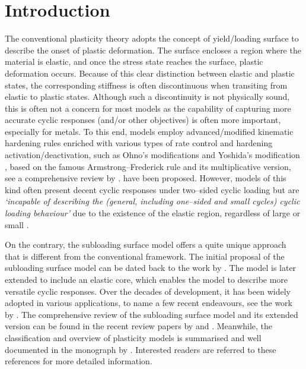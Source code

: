 \section{Introduction}
The conventional plasticity theory adopts the concept of yield/loading surface \citep[see, e.g.,][]{Lemaitre1990,Simo1998} to describe the onset of plastic deformation.
The surface encloses a region where the material is elastic, and once the stress state reaches the surface, plastic deformation occurs.
Because of this clear distinction between elastic and plastic states, the corresponding stiffness is often discontinuous when transiting from elastic to plastic states.
Although such a discontinuity is not physically sound, this is often not a concern for most models as the capability of capturing more accurate cyclic responses (and/or other objectives) is often more important, especially for metals.
To this end, models employ advanced/modified kinematic hardening rules enriched with various types of rate control and hardening activation/deactivation, such as Ohno's modifications \citep[see, e.g.,][]{Ohno1982,Ohno1993,Ohno2021} and Yoshida's modification \citep{Yoshida2002}, based on the famous Armstrong--Frederick rule \citep{Frederick2007} and its multiplicative version, see a comprehensive review by \citet{Chaboche2008}. have been proposed.
However, models of this kind often present decent cyclic responses under two--sided cyclic loading but are \emph{`incapable of describing the \textnormal{(general, including one--sided and small cycles)} cyclic loading behaviour'} \citep[][pg. 282]{Hashiguchi2023} due to the existence of the elastic region, regardless of large or small \citep{Dafalias1977}.

On the contrary, the subloading surface model offers a quite unique approach that is different from the conventional framework.
The initial proposal of the subloading surface model can be dated back to the work by \citet{Hashiguchi1980}.
The model is later extended \citep{Hashiguchi1989} to include an elastic core, which enables the model to describe more versatile cyclic responses.
Over the decades of development, it has been widely adopted in various applications, to name a few recent endeavours, see the work by \citet{Maranha2016,Xiong2018,Anjiki2021,Yamakawa2021,Yamakawa2022,Lu2023}.
The comprehensive review of the subloading surface model and its extended version can be found in the recent review papers by \citet{Hashiguchi2023a} and \citet{Hashiguchi2024}.
Meanwhile, the classification and overview of plasticity models is summarised and well documented in the monograph by \citet[see][\S~10.2]{Hashiguchi2023}.
Interested readers are referred to these references for more detailed information.

